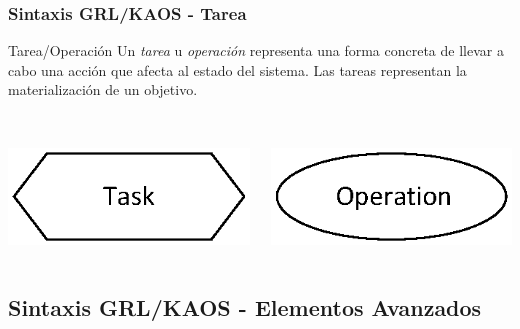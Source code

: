 \documentclass[handout,slidestop,xcolor=pst,dvips,blue]{beamer}
\begin{document}
\begin{frame}[c]
    \frametitle{Sintaxis GRL/KAOS - Tarea}
    \begin{block}{Tarea/Operación}
        Un \alert{\emph{tarea}} u \alert{\emph{operación}} representa una forma concreta de llevar a cabo una acción que afecta al estado del sistema.
        Las tareas representan la materialización de un objetivo.
        \ \\
        \ \\
        \begin{columns}[c]
            \begin{column}{0.50\linewidth}
                \centering \includegraphics[width=0.5\columnwidth,keepaspectratio=true]{images/objetivos/task(GRL).eps}
            \end{column}
            \begin{column}{0.50\linewidth}
                \centering \includegraphics[width=0.5\columnwidth,keepaspectratio=true]{images/objetivos/operation(KAOS).eps}
            \end{column}
        \end{columns}
    \end{block}
\end{frame}

\subsection[Sintaxis GRL/KAOS (II)]{Sintaxis GRL/KAOS - Elementos Avanzados}
\end{document}

